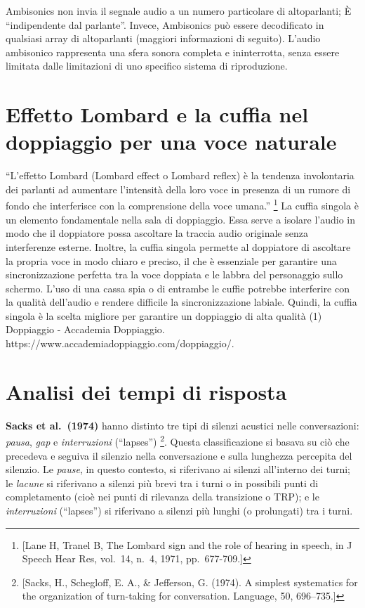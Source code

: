 \documentclass[
]{article}
\begin{document}
Ambisonics non invia il segnale audio a un numero particolare di altoparlanti; È ``indipendente dal parlante''. Invece, Ambisonics può essere decodificato in qualsiasi array di altoparlanti (maggiori informazioni di seguito). L'audio ambisonico rappresenta una sfera sonora completa e ininterrotta, senza essere limitata dalle limitazioni di uno specifico sistema di riproduzione.

\section{Effetto Lombard e la cuffia nel doppiaggio per una voce naturale}\label{effetto-lombard-e-la-cuffia-nel-doppiaggio-per-una-voce-naturale}

``L'effetto Lombard (Lombard effect o Lombard reflex) è la tendenza involontaria dei parlanti ad aumentare l'intensità della loro voce in presenza di un rumore di fondo che interferisce con la comprensione della voce umana.'' \footnote{{[}Lane H, Tranel B, The Lombard sign and the role of hearing in speech, in J Speech Hear Res, vol.~14, n.~4, 1971, pp.~677-709.{]}} La cuffia singola è un elemento fondamentale nella sala di doppiaggio. Essa serve a isolare l'audio in modo che il doppiatore possa ascoltare la traccia audio originale senza interferenze esterne. Inoltre, la cuffia singola permette al doppiatore di ascoltare la propria voce in modo chiaro e preciso, il che è essenziale per garantire una sincronizzazione perfetta tra la voce doppiata e le labbra del personaggio sullo schermo. L'uso di una cassa spia o di entrambe le cuffie potrebbe interferire con la qualità dell'audio e rendere difficile la sincronizzazione labiale. Quindi, la cuffia singola è la scelta migliore per garantire un doppiaggio di alta qualità (1) Doppiaggio - Accademia Doppiaggio. https://www.accademiadoppiaggio.com/doppiaggio/.

\section{Analisi dei tempi di risposta}\label{analisi-dei-tempi-di-risposta}

\textbf{Sacks et al.~(1974)} hanno distinto tre tipi di silenzi acustici nelle conversazioni: \emph{pausa}, \emph{gap} e \emph{interruzioni} (``lapses'') \footnote{{[}Sacks, H., Schegloff, E. A., \& Jefferson, G. (1974). A simplest systematics for the organization of turn-taking for conversation. Language, 50, 696--735.{]}}. Questa classificazione si basava su ciò che precedeva e seguiva il silenzio nella conversazione e sulla lunghezza percepita del silenzio. Le \emph{pause}, in questo contesto, si riferivano ai silenzi all'interno dei turni; le \emph{lacune} si riferivano a silenzi più brevi tra i turni o in possibili punti di completamento (cioè nei punti di rilevanza della transizione o TRP); e le \emph{interruzioni} (``lapses'') si riferivano a silenzi più lunghi (o prolungati) tra i turni.
\end{document}
